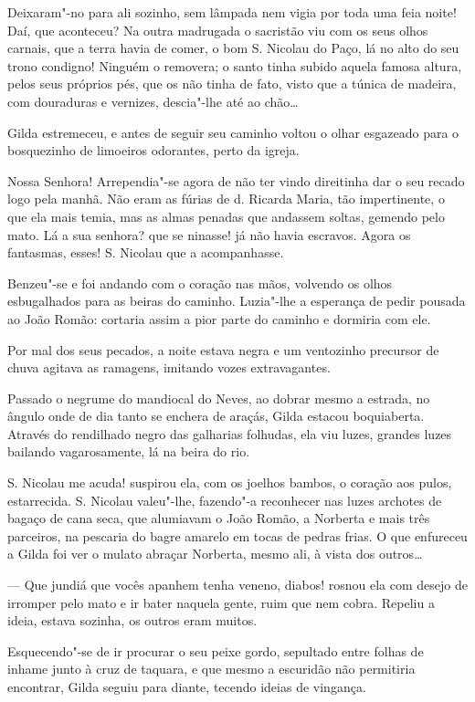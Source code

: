Deixaram"-no para ali sozinho, sem lâmpada nem vigia por toda uma feia
noite! Daí, que aconteceu? Na outra madrugada o sacristão viu com os
seus olhos carnais, que a terra havia de comer, o bom S. Nicolau do
Paço, lá no alto do seu trono condigno! Ninguém o removera; o santo
tinha subido aquela famosa altura, pelos seus próprios pés, que os não
tinha de fato, visto que a túnica de madeira, com douraduras e vernizes,
descia"-lhe até ao chão\ldots{}

Gilda estremeceu, e antes de seguir seu caminho voltou o olhar esgazeado
para o bosquezinho de limoeiros odorantes, perto da igreja.

Nossa Senhora! Arrependia"-se agora de não ter vindo direitinha dar o seu
recado logo pela manhã. Não eram as fúrias de d. Ricarda Maria, tão
impertinente, o que ela mais temia, mas as almas penadas que andassem
soltas, gemendo pelo mato. Lá a sua senhora? que se ninasse! já não
havia escravos. Agora os fantasmas, esses! S. Nicolau que a
acompanhasse.

Benzeu"-se e foi andando com o coração nas mãos, volvendo os olhos
esbugalhados para as beiras do caminho. Luzia"-lhe a esperança de pedir
pousada ao João Romão: cortaria assim a pior parte do caminho e dormiria
com ele.

Por mal dos seus pecados, a noite estava negra e um ventozinho precursor
de chuva agitava as ramagens, imitando vozes extravagantes.

Passado o negrume do mandiocal do Neves, ao dobrar mesmo a estrada, no
ângulo onde de dia tanto se enchera de araçás, Gilda estacou
boquiaberta. Através do rendilhado negro das galharias folhudas, ela viu
luzes, grandes luzes bailando vagarosamente, lá na beira do rio.

S. Nicolau me acuda! suspirou ela, com os joelhos bambos, o coração aos
pulos, estarrecida. S. Nicolau valeu"-lhe, fazendo"-a reconhecer nas luzes
archotes de bagaço de cana seca, que alumiavam o João Romão, a Norberta
e mais três parceiros, na pescaria do bagre amarelo em tocas de pedras
frias. O que enfureceu a Gilda foi ver o mulato abraçar Norberta, mesmo
ali, à vista dos outros\ldots{}

--- Que jundiá que vocês apanhem tenha veneno, diabos! rosnou ela com
desejo de irromper pelo mato e ir bater naquela gente, ruim que nem
cobra. Repeliu a ideia, estava sozinha, os outros eram muitos.

Esquecendo"-se de ir procurar o seu peixe gordo, sepultado entre folhas
de inhame junto à cruz de taquara, e que mesmo a escuridão não
permitiria encontrar, Gilda seguiu para diante, tecendo ideias de
vingança.

